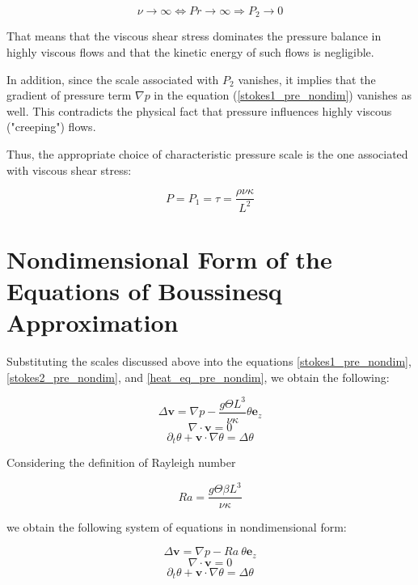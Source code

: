 \documentclass[
10pt, %
a4paper, %
oneside, %
headinclude,footinclude, %
BCOR5mm, %
]{scrartcl}
\providecommand{\divergence}{\nabla\cdot}
\providecommand{\velocity}{\mathbf{v}}
\providecommand{\surfaceNormal}{\mathbf{e}_z}
\providecommand{\pressGrad}{\nabla p}
\providecommand{\laplacianVel}{\Delta\velocity}
\providecommand{\partialTimeTemp}{\partial_t\theta}
\providecommand{\inertTermTemp}{\velocity\cdot\nabla\theta}
\providecommand{\laplacianTemp}{\Delta\theta}
\begin{document}
$$ \nu \longrightarrow \infty \Longleftrightarrow Pr \longrightarrow \infty \Longrightarrow P_2 \longrightarrow 0 $$

That means that the viscous shear stress dominates the pressure balance in highly viscous flows and that the kinetic energy of such flows is negligible.

In addition, since the scale associated with $P_2$ vanishes, it implies that the gradient of pressure term $\pressGrad$ in the equation (\ref{stokes1_pre_nondim}) vanishes as well. This contradicts the physical fact that pressure influences highly viscous ("creeping") flows.\cite[pp. 433-434]{leal}

Thus, the appropriate choice of characteristic pressure scale is the one associated with viscous shear stress:

$$ P = P_1 = \tau = \frac{\rho \nu \kappa}{L^2}$$

\section{Nondimensional Form of the Equations of Boussinesq Approximation}

Substituting the scales discussed above into the equations \ref{stokes1_pre_nondim}, \ref{stokes2_pre_nondim}, and \ref{heat_eq_pre_nondim}, we obtain the following:

\begin{equation} \label{stokes1_nondim_no_parameters}
\laplacianVel = \pressGrad - \frac{g \Theta L^3}{\nu \kappa} \theta \surfaceNormal
\end{equation}
\begin{equation} \label{stokes2_nondim_no_parameters}
\divergence \velocity = 0
\end{equation}
\begin{equation} \label{heat_eq_nondim_no_parameters}
\partialTimeTemp + \inertTermTemp = \laplacianTemp  
\end{equation} 

Considering the definition of Rayleigh number 

$$ Ra = \frac{g\Theta \beta L^3}{\nu\kappa} $$

we obtain the following system of equations in nondimensional form:

\begin{equation} \label{NS1_viscNondim_boussinesq_prandtl}
\laplacianVel = \pressGrad - Ra ~\theta \surfaceNormal
\end{equation}
\begin{equation} \label{NS2_viscNondim_boussinesq_prandtl}
\divergence \velocity = 0
\end{equation}
\begin{equation} \label{heat_eq_viscNondim_boussinesq_prandtl}
\partialTimeTemp + \inertTermTemp = \laplacianTemp  
\end{equation} 
\end{document}
